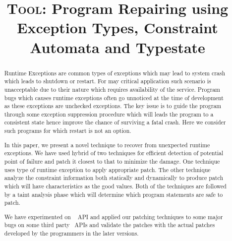 \documentclass[pldi]{sigplanconf}
\def\tool{\textsc{Tool}\xspace}
\def\papertitle{\tool: Program Repairing using Exception Types, Constraint
Automata and Typestate}
\begin{document}
\title{\Large \bf \papertitle}

\maketitle

\begin{abstract}
\small

Runtime Exceptions are common types of exceptions which may lead to system crash
which leads to shutdown or restart. For may critical application such scenario
is unacceptable due to their nature which requires availability of the service. 
Program bugs which causes runtime exceptions often go unnoticed at the time of
development as these exceptions are unchecked exceptions. The key issue is to
guide the program through some exception suppression procedure which will leads
the program to a consistent state hence improve the chance of surviving a fatal
crash. Here we consider such programs for which restart is not an option.

In this paper, we present a novel technique to recover from unexpected runtime
exceptions. We have used hybrid of two techniques for efficient detection of
potential point of failure and patch it closest to that to minimize the damage. 
One technique uses type of runtime exception to apply appropriate patch. The
other technique analyze the constraint information both statically and
dynamically to produce patch which will have characteristics as the good values.
Both of the techniques are followed by a taint analysis phase which will
determine which program statements are safe to patch.

We have experimented on \java\  API and applied our patching
techniques to some major bugs on some third party \java\ APIs and validate the
patches with the actual patches developed by the programmers in the later
versions.

\end{abstract}

% 















\raggedright
\small


\end{document}

